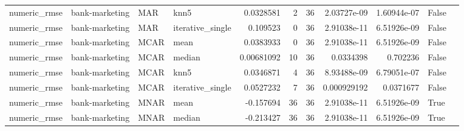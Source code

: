 \begin{table}[ht]
\begin{tabular}{llllrrrrrll}
 numeric\_rmse           & bank-marketing       & MAR         & knn5             &      0.0328581   &                   2 &      36 & 2.03727e-09 & 1.60944e-07 & False              &                                                                                                                    \\
 numeric\_rmse           & bank-marketing       & MAR         & iterative\_single &      0.109523    &                   0 &      36 & 2.91038e-11 & 6.51926e-09 & False              &                                                                                                                    \\
 numeric\_rmse           & bank-marketing       & MCAR        & mean             &      0.0383933   &                   0 &      36 & 2.91038e-11 & 6.51926e-09 & False              &                                                                                                                    \\
 numeric\_rmse           & bank-marketing       & MCAR        & median           &      0.00681092  &                  10 &      36 & 0.0334398   & 0.702236    & False              &                                                                                                                    \\
 numeric\_rmse           & bank-marketing       & MCAR        & knn5             &      0.0346871   &                   4 &      36 & 8.93488e-09 & 6.79051e-07 & False              &                                                                                                                    \\
 numeric\_rmse           & bank-marketing       & MCAR        & iterative\_single &      0.0527232   &                   7 &      36 & 0.000929192 & 0.0371677   & False              &                                                                                                                    \\
 numeric\_rmse           & bank-marketing       & MNAR        & mean             &     -0.157694    &                  36 &      36 & 2.91038e-11 & 6.51926e-09 & True               &                                                                                                                    \\
 numeric\_rmse           & bank-marketing       & MNAR        & median           &     -0.213427    &                  36 &      36 & 2.91038e-11 & 6.51926e-09 & True               &                                                                                                                    \\

\end{tabular}
\end{table}
